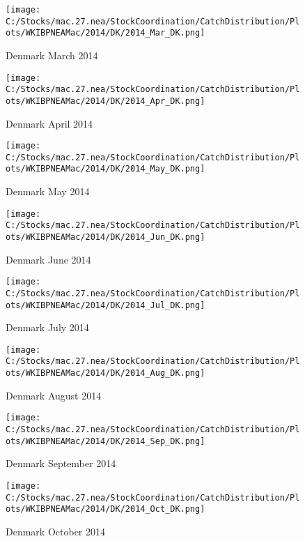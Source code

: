 \documentclass{article}
\begin{document}
\begin{figure}
	\centering
		\texttt{[image: C:/Stocks/mac.27.nea/StockCoordination/CatchDistribution/Plots/WKIBPNEAMac/2014/DK/2014\_Mar\_DK.png]}
	\caption{Denmark March 2014}
	\label{fig:2014_Mar_DK}
\end{figure}

\begin{figure}
	\centering
		\texttt{[image: C:/Stocks/mac.27.nea/StockCoordination/CatchDistribution/Plots/WKIBPNEAMac/2014/DK/2014\_Apr\_DK.png]}
	\caption{Denmark April 2014}
	\label{fig:2014_Apr_DK}
\end{figure}

\begin{figure}
	\centering
		\texttt{[image: C:/Stocks/mac.27.nea/StockCoordination/CatchDistribution/Plots/WKIBPNEAMac/2014/DK/2014\_May\_DK.png]}
	\caption{Denmark May 2014}
	\label{fig:2014_May_DK}
\end{figure}

\begin{figure}
	\centering
		\texttt{[image: C:/Stocks/mac.27.nea/StockCoordination/CatchDistribution/Plots/WKIBPNEAMac/2014/DK/2014\_Jun\_DK.png]}
	\caption{Denmark June 2014}
	\label{fig:2014_Jun_DK}
\end{figure}

\begin{figure}
	\centering
		\texttt{[image: C:/Stocks/mac.27.nea/StockCoordination/CatchDistribution/Plots/WKIBPNEAMac/2014/DK/2014\_Jul\_DK.png]}
	\caption{Denmark July 2014}
	\label{fig:2014_Jul_DK}
\end{figure}

\begin{figure}
	\centering
		\texttt{[image: C:/Stocks/mac.27.nea/StockCoordination/CatchDistribution/Plots/WKIBPNEAMac/2014/DK/2014\_Aug\_DK.png]}
	\caption{Denmark August 2014}
	\label{fig:2014_Aug_DK}
\end{figure}

\begin{figure}
	\centering
		\texttt{[image: C:/Stocks/mac.27.nea/StockCoordination/CatchDistribution/Plots/WKIBPNEAMac/2014/DK/2014\_Sep\_DK.png]}
	\caption{Denmark September 2014}
	\label{fig:2014_Sep_DK}
\end{figure}

\begin{figure}
	\centering
		\texttt{[image: C:/Stocks/mac.27.nea/StockCoordination/CatchDistribution/Plots/WKIBPNEAMac/2014/DK/2014\_Oct\_DK.png]}
	\caption{Denmark October 2014}
	\label{fig:2014_Oct_DK}
\end{figure}
\end{document}
